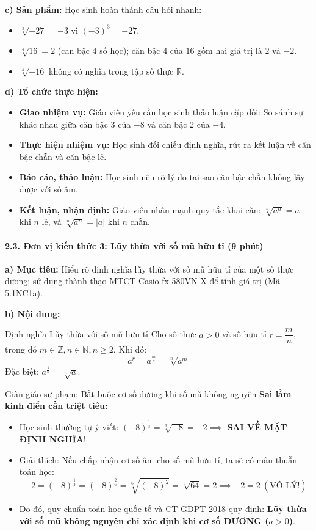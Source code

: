 \documentclass[12pt, a4paper]{article}
\begin{document}
\noindent \textbf{c) Sản phẩm:}
Học sinh hoàn thành câu hỏi nhanh:
\begin{itemize}
    \item $\sqrt[3]{-27} = -3$ vì $(-3)^3 = -27$.
    \item $\sqrt[4]{16} = 2$ (căn bậc $4$ số học); căn bậc $4$ của $16$ gồm hai giá trị là $2$ và $-2$.
    \item $\sqrt[4]{-16}$ không có nghĩa trong tập số thực $\mathbb{R}$.
\end{itemize}

\noindent \textbf{d) Tổ chức thực hiện:}
\begin{itemize}[leftmargin=0.6cm]
    \item \textbf{Giao nhiệm vụ:} Giáo viên yêu cầu học sinh thảo luận cặp đôi: So sánh sự khác nhau giữa căn bậc 3 của $-8$ và căn bậc 2 của $-4$.
    \item \textbf{Thực hiện nhiệm vụ:} Học sinh đối chiếu định nghĩa, rút ra kết luận về căn bậc chẵn và căn bậc lẻ.
    \item \textbf{Báo cáo, thảo luận:} Học sinh nêu rõ lý do tại sao căn bậc chẵn không lấy được với số âm.
    \item \textbf{Kết luận, nhận định:} Giáo viên nhấn mạnh quy tắc khai căn: $\sqrt[n]{a^n} = a$ khi $n$ lẻ, và $\sqrt[n]{a^n} = |a|$ khi $n$ chẵn.
\end{itemize}

\paragraph{2.3. Đơn vị kiến thức 3: Lũy thừa với số mũ hữu tỉ (9 phút)}

\noindent \textbf{a) Mục tiêu:}
Hiểu rõ định nghĩa lũy thừa với số mũ hữu tỉ của một số thực dương; sử dụng thành thạo MTCT Casio fx-580VN X để tính giá trị (Mã 5.1NC1a).

\noindent \textbf{b) Nội dung:}
\begin{pedabox}{Định nghĩa Lũy thừa với số mũ hữu tỉ}
Cho số thực $a > 0$ và số hữu tỉ $r = \dfrac{m}{n}$, trong đó $m \in \mathbb{Z}, n \in \mathbb{N}, n \ge 2$. Khi đó:
$$a^r = a^{\frac{m}{n}} = \sqrt[n]{a^m}$$
Đặc biệt: $a^{\frac{1}{n}} = \sqrt[n]{a}$.
\end{pedabox}

\begin{scaffoldbox}{Giàn giáo sư phạm: Bắt buộc cơ số dương khi số mũ không nguyên}
\textbf{Sai lầm kinh điển cần triệt tiêu:}
\begin{itemize}
    \item Học sinh thường tự ý viết: $(-8)^{\frac{1}{3}} = \sqrt[3]{-8} = -2 \implies$ \textbf{SAI VỀ MẶT ĐỊNH NGHĨA}!
    \item Giải thích: Nếu chấp nhận cơ số âm cho số mũ hữu tỉ, ta sẽ có mâu thuẫn toán học:
    $$-2 = (-8)^{\frac{1}{3}} = (-8)^{\frac{2}{6}} = \sqrt[6]{(-8)^2} = \sqrt[6]{64} = 2 \implies -2 = 2 \ (\text{VÔ LÝ!})$$
    \item Do đó, quy chuẩn toán học quốc tế và CT GDPT 2018 quy định: \textbf{Lũy thừa với số mũ không nguyên chỉ xác định khi cơ số DƯƠNG ($a > 0$)}.
\end{itemize}
\end{scaffoldbox}
\end{document}
